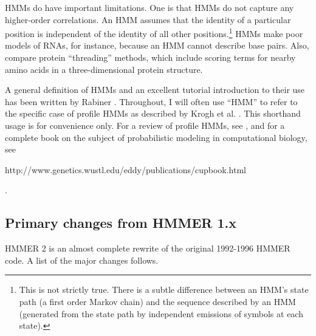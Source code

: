 HMMs do have important limitations. One is that HMMs do not capture
any higher-order correlations.  An HMM assumes that the identity of a
particular position is independent of the identity of all other
positions.\footnote{This is not strictly true. There is a subtle
difference between an HMM's state path (a first order Markov chain)
and the sequence described by an HMM (generated from the state path by
independent emissions of symbols at each state).} HMMs make poor
models of RNAs, for instance, because an HMM cannot describe base
pairs. Also, compare protein ``threading'' methods, which include
scoring terms for nearby amino acids in a three-dimensional protein
structure. 

A general definition of HMMs and an excellent tutorial introduction to
their use has been written by Rabiner \cite{Rabiner89}. Throughout, I
will often use ``HMM'' to refer to the specific case of profile HMMs
as described by Krogh et al. \cite{Krogh94}. This shorthand usage is
for convenience only. For a review of profile HMMs, see \cite{Eddy96},
and for a complete book on the subject of probabilistic modeling in
computational biology, see \cite{Durbin98} 
\begin{htmlonly}
{http://www.genetics.wustl.edu/eddy/publications/cupbook.html}
\end{htmlonly}.

\subsection{Primary changes from HMMER 1.x}

HMMER 2 is an almost complete rewrite of the original 1992-1996 HMMER
code. A list of the major changes follows.

